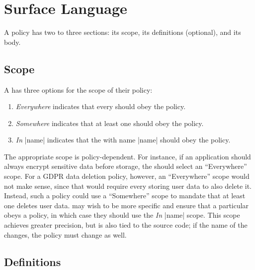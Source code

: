 \section{Surface Language}
\label{sec:interface}

A \syslang{} policy has two to three sections: its scope, its definitions (optional), and its body.

\subsection{Scope}
\label{sec:scope}

A \ce{} has three options for the scope of their policy:
%
\begin{enumerate}[nosep]
    \item \emph{Everywhere} indicates that every \controller{} should obey the policy.
    \item \emph{Somewhere} indicates that at least one \controller{} should obey the policy.
    \item \emph{In} |name| indicates that the \controller{} with name |name| should obey the policy.
\end{enumerate}

The appropriate scope is policy-dependent.
%
For instance, if an application should always encrypt sensitive data before storage,
the \ce{} should select an ``Everywhere'' scope.
%
For a GDPR data deletion policy, however, an ``Everywhere'' scope would not make sense, 
since that would require every \controller{} storing user data to also delete it.
%
Instead, such a policy could use a ``Somewhere'' scope to mandate that at least one \controller{} deletes user data.
%
\Ces{} may wish to be more specific and ensure that a particular \controller{} obeys a policy,
in which case they should use the \emph{In} |name| scope.
%
This scope achieves greater precision, but is also tied to the source code; 
if the name of the \controller{} changes, the policy must change as well.
%

\subsection{Definitions}
\label{sec:definitions}

